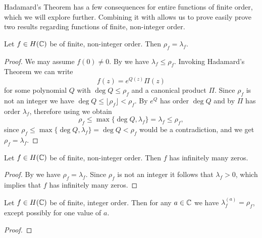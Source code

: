 Hadamard's Theorem has a few consequences for entire functions of finite order, which we will explore further. Combining it with  allows us to prove easily prove two results regarding functions of finite, non-integer order.

\begin{theorem} \label{thm:finite-non-integer-order-equals-exponent-of-convergence}
    Let $f \in H(\mathbb{C})$ be of finite, non-integer order. Then $\rho_f = \lambda_f$.
\end{theorem}

\begin{proof}
    We may assume $f(0) \neq 0$. By  we have $\lambda_f \leq \rho_f$. Invoking Hadamard's Theorem we can write
    $$ f(z) = e^{Q(z)} \Pi(z) $$
    for some polynomial $Q$ with $\deg Q \leq \rho_f$ and a canonical product $\Pi$. Since $\rho_f$ is not an integer we have $\deg Q \leq \lfloor \rho_f \rfloor < \rho_f$. By  $e^Q$ has order $\deg Q$ and by  $\Pi$ has order $\lambda_f$, therefore using  we obtain
    $$ \rho_f \leq \max \{ \deg Q, \lambda_f \} = \lambda_f \leq \rho_f, $$
    since $\rho_f \leq \max \{ \deg Q, \lambda_f \} = \deg Q < \rho_f$ would be a contradiction, and we get $\rho_f = \lambda_f$.
\end{proof}

\begin{theorem} \label{thm:finite-non-integer-order-infinite-zeros}
    Let $f \in H(\mathbb{C})$ be of finite, non-integer order. Then $f$ has infinitely many zeros.
\end{theorem}

\begin{proof}
    By  we have $\rho_f = \lambda_f$. Since $\rho_f$ is not an integer it follows that $\lambda_f > 0$, which implies that $f$ has infinitely many zeros.
\end{proof}

\begin{theorem}[Borel] \label{thm:existence-borel-exceptional-values}
    Let $f \in H(\mathbb{C})$ be of finite, integer order. Then for any $a \in \mathbb{C}$ we have $\lambda_f^{(a)} = \rho_f$, except possibly for one value of $a$.
\end{theorem}

\begin{proof}
\end{proof}

